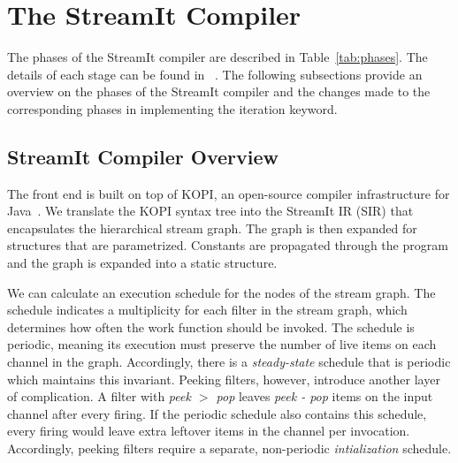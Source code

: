 \section{The StreamIt Compiler}
\label{sec:compiler}
The phases of the StreamIt compiler are described in
Table~\ref{tab:phases}.  The details of each stage can be found in
~\cite{streamit-asplos}.  The following subsections provide an
overview on the phases of the StreamIt compiler and the changes made
to the corresponding phases in implementing the iteration keyword.

\subsection{StreamIt Compiler Overview}
\label{sec:compiler-overview}

The front end is built on top of KOPI, an open-source compiler 
infrastructure for Java~\cite{kopi}.  We translate the KOPI syntax 
tree into the StreamIt IR (SIR) that encapsulates the hierarchical 
stream graph.  The graph is then expanded for structures that
are parametrized.  Constants are propagated through the program
and the graph is expanded into a static structure.

We can calculate an execution schedule for the nodes of the stream 
graph.  The schedule indicates a multiplicity for each filter in the
stream graph, which determines how often the work function should be
invoked.  The schedule is periodic, meaning its
execution must preserve the number of live items on each channel in
the graph.  Accordingly, there is a {\it steady-state} schedule that is 
periodic which maintains this invariant.  Peeking filters, however, 
introduce another layer of complication.
A filter with {\it peek $>$ pop} leaves {\it peek - pop} items on the
input channel after every firing.  If the periodic schedule also
contains this schedule, every firing would leave extra leftover items
in the channel per invocation.  Accordingly, peeking filters require a separate,
non-periodic {\it intialization} schedule.  




